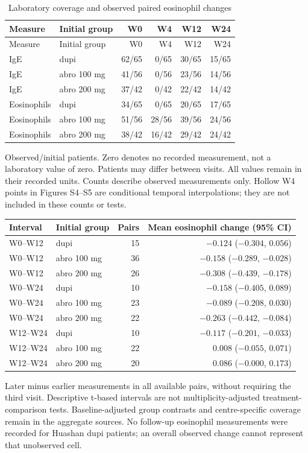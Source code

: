 {\small\setlength{\tabcolsep}{4pt}
\begin{longtable}{llrrrr}
\caption{Laboratory coverage and observed paired eosinophil changes}\label{tab:laboratory_support}\\
\toprule Measure & Initial group & W0 & W4 & W12 & W24 \\ \midrule\endfirsthead
\toprule Measure & Initial group & W0 & W4 & W12 & W24 \\ \midrule\endhead
IgE & dupi & 62/65 & 0/65 & 30/65 & 15/65 \\
IgE & abro 100 mg & 41/56 & 0/56 & 23/56 & 14/56 \\
IgE & abro 200 mg & 37/42 & 0/42 & 22/42 & 14/42 \\
Eosinophils & dupi & 34/65 & 0/65 & 20/65 & 17/65 \\
Eosinophils & abro 100 mg & 51/56 & 28/56 & 39/56 & 24/56 \\
Eosinophils & abro 200 mg & 38/42 & 16/42 & 29/42 & 24/42 \\
\bottomrule\end{longtable}
}
\noindent Observed/initial patients. Zero denotes no recorded measurement, not a laboratory value of zero. Patients may differ between visits. All values remain in their recorded units. Counts describe observed measurements only. Hollow W4 points in Figures S4--S5 are conditional temporal interpolations; they are not included in these counts or tests.

{\small\begin{tabular}{llrr}\toprule Interval & Initial group & Pairs & Mean eosinophil change (95\% CI) \\ \midrule
W0--W12 & dupi & 15 & $-0.124$ ($-0.304$, $0.056$) \\
W0--W12 & abro 100 mg & 36 & $-0.158$ ($-0.289$, $-0.028$) \\
W0--W12 & abro 200 mg & 26 & $-0.308$ ($-0.439$, $-0.178$) \\
W0--W24 & dupi & 10 & $-0.158$ ($-0.405$, $0.089$) \\
W0--W24 & abro 100 mg & 23 & $-0.089$ ($-0.208$, $0.030$) \\
W0--W24 & abro 200 mg & 22 & $-0.263$ ($-0.442$, $-0.084$) \\
W12--W24 & dupi & 10 & $-0.117$ ($-0.201$, $-0.033$) \\
W12--W24 & abro 100 mg & 22 & $0.008$ ($-0.055$, $0.071$) \\
W12--W24 & abro 200 mg & 20 & $0.086$ ($-0.000$, $0.173$) \\
\bottomrule\end{tabular}}

Later minus earlier measurements in all available pairs, without requiring the third visit. Descriptive t-based intervals are not multiplicity-adjusted treatment-comparison tests. Baseline-adjusted group contrasts and centre-specific coverage remain in the aggregate sources. No follow-up eosinophil measurements were recorded for Huashan dupi patients; an overall observed change cannot represent that unobserved cell.
